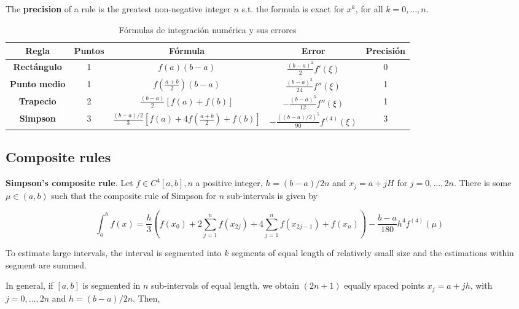 \documentclass[12pt]{article}
\theoremstyle{definition}
\begin{document}
The \textbf{precision} of a rule is the greatest non-negative integer $n$ s.t. 
the formula is exact for $x^k$, for all $k = 0, \ldots, n$.

\begin{table}[h!]
\centering
\begin{tabular}{|>{\bfseries}c|c|c|c|c|}
\hline
Regla & Puntos & Fórmula & Error & Precisión \\
\hline
Rectángulo & 1 & $f(a)(b - a)$ & $\frac{(b - a)^2}{2} f'(\xi)$ & 0 \\
\hline
Punto medio & 1 & $f\left(\frac{a + b}{2}\right)(b - a)$ & $\frac{(b - a)^3}{24} f''(\xi)$ & 1 \\
\hline
Trapecio & 2 & $\frac{(b - a)}{2} [f(a) + f(b)]$ & $-\frac{(b - a)^3}{12} f''(\xi)$ & 1 \\
\hline
Simpson & 3 & $\frac{(b - a)/2}{3} \left[ f(a) + 4f\left(\frac{a + b}{2}\right) + f(b) \right]$ & $-\frac{((b - a)/2)^5}{90} f^{(4)}(\xi)$ & 3 \\
\hline
\end{tabular}
\caption{Fórmulas de integración numérica y sus errores}
\end{table}

\subsection{Composite rules}

\begin{shaded}
    \textbf{Simpson's composite rule}. Let $f \in C^4[a, b], n$ a positive
    integer, $h = (b-a) / 2n$ and $x_j = a + jH$ for $j = 0, \ldots, 2n$.
    There is some $\mu \in (a, b)$ such that the composite rule of Simpson for
    $n$ sub-intervals is given by 

    \begin{equation*}
        \int_a^b f(x) = \frac{h}{3}\left( f(x_0) + 2 \sum_{j=1}^n f(x_{2j}) + 4
        \sum_{j=1}^n f(x_{2j - 1}) + f(x_n)\right) - \frac{b-a}{180}h^4
        f^{(4)}(\mu)
    \end{equation*}
\end{shaded}

To estimate large intervals, the interval is segmented into $k$ segments of
equal length of relatively small size and the estimations within segment are
summed. 

In general, if $[a, b]$ is segmented in $n$ sub-intervals of equal length, we
obtain $(2n+1)$ equally spaced points $x_j = a + jh$, with $j = 0, \ldots, 2n$
and $h = (b-a) / 2n$. Then, 
\end{document}
